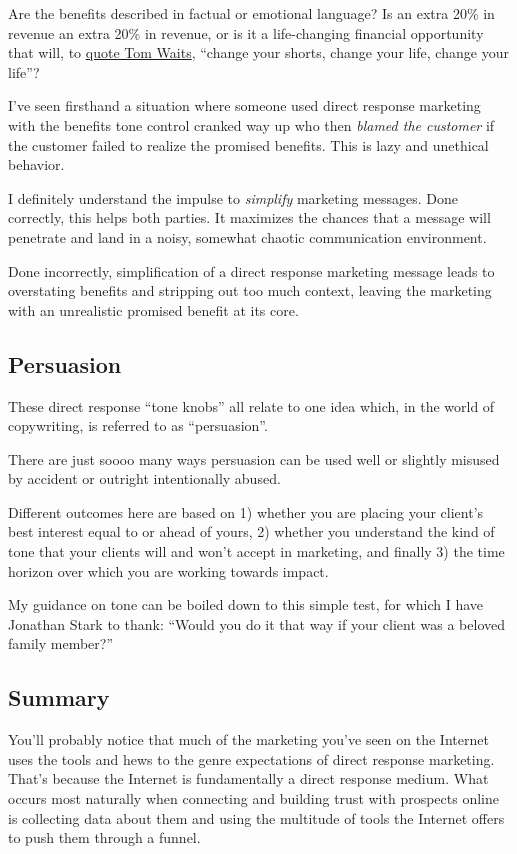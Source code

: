 \documentclass[13pt,]{tufte-handout}
\begin{document}
Are the benefits described in factual or emotional language? Is an extra
20\% in revenue an extra 20\% in revenue, or is it a life-changing
financial opportunity that will, to
\href{https://genius.com/Tom-waits-step-right-up-lyrics}{quote Tom
Waits}, ``change your shorts, change your life, change your life''?

I've seen firsthand a situation where someone used direct response
marketing with the benefits tone control cranked way up who then
\emph{blamed the customer} if the customer failed to realize the
promised benefits. This is lazy and unethical behavior.

I definitely understand the impulse to \emph{simplify} marketing
messages. Done correctly, this helps both parties. It maximizes the
chances that a message will penetrate and land in a noisy, somewhat
chaotic communication environment.

Done incorrectly, simplification of a direct response marketing message
leads to overstating benefits and stripping out too much context,
leaving the marketing with an unrealistic promised benefit at its core.

\hypertarget{persuasion}{%
\subsection{Persuasion}\label{persuasion}}

These direct response ``tone knobs'' all relate to one idea which, in
the world of copywriting, is referred to as ``persuasion''.

There are just soooo many ways persuasion can be used well or slightly
misused by accident or outright intentionally abused.

Different outcomes here are based on 1) whether you are placing your
client's best interest equal to or ahead of yours, 2) whether you
understand the kind of tone that your clients will and won't accept in
marketing, and finally 3) the time horizon over which you are working
towards impact.

My guidance on tone can be boiled down to this simple test, for which I
have Jonathan Stark to thank: ``Would you do it that way if your client
was a beloved family member?''

\hypertarget{summary}{%
\subsection{Summary}\label{summary}}

You'll probably notice that much of the marketing you've seen on the
Internet uses the tools and hews to the genre expectations of direct
response marketing. That's because the Internet is fundamentally a
direct response medium. What occurs most naturally when connecting and
building trust with prospects online is collecting data about them and
using the multitude of tools the Internet offers to push them through a
funnel.
\end{document}
